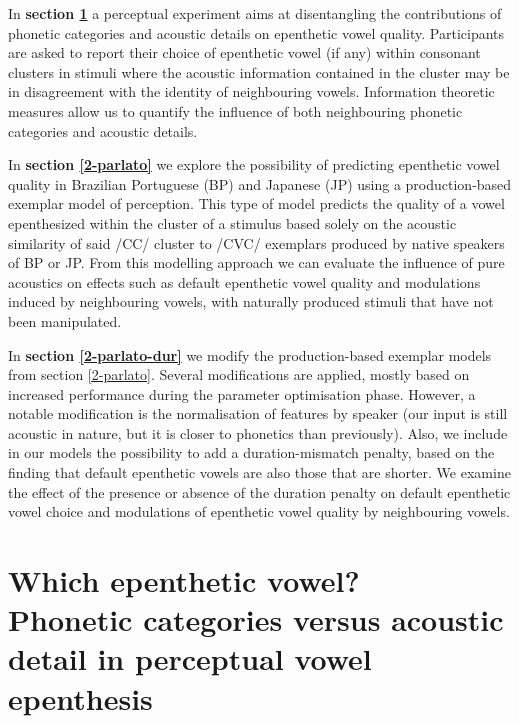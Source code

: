 In \textbf{section \ref{2-ahpa}} a perceptual experiment aims at disentangling the contributions of phonetic categories and acoustic details on epenthetic vowel quality. Participants are asked to report their choice of epenthetic vowel (if any) within consonant clusters in stimuli where the acoustic information contained in the cluster may be in disagreement with the identity of neighbouring vowels. Information theoretic measures allow us to quantify the influence of both neighbouring phonetic categories and acoustic details.

In \textbf{section \ref{2-parlato}} we explore the possibility of predicting epenthetic vowel quality in Brazilian Portuguese (BP) and Japanese (JP) using a production-based exemplar model of perception. This type of model predicts the quality of a vowel epenthesized within the cluster of a stimulus based solely on the acoustic similarity of said /CC/ cluster to /CVC/ exemplars produced by native speakers of BP or JP. From this modelling approach we can evaluate the influence of pure acoustics on effects such as default epenthetic vowel quality and modulations induced by neighbouring vowels, with naturally produced stimuli that have not been manipulated.

In \textbf{section \ref{2-parlato-dur}} we modify the production-based exemplar models from section \ref{2-parlato}. Several modifications are applied, mostly based on increased performance during the parameter optimisation phase. However, a notable modification is the normalisation of features by speaker (our input is still acoustic in nature, but it is closer to phonetics than previously). Also, we include in our models the possibility to add a duration-mismatch penalty, based on the finding that default epenthetic vowels are also those that are shorter. We examine the effect of the presence or absence of the duration penalty on default epenthetic vowel choice and modulations of epenthetic vowel quality by neighbouring vowels.   


\section{Which epenthetic vowel? \\ Phonetic categories versus acoustic detail in perceptual vowel epenthesis} \label{2-ahpa}

